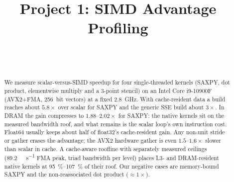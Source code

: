 \documentclass[11pt]{article}
\title{Project 1: SIMD Advantage Profiling}
\author{\acsauthor\\[2pt]\small\acscourse\\\small\href{mailto:\acsemail}{\acsemail}}
\date{\acsdue}
\begin{document}
\maketitle

\begin{abstract}
  We measure scalar-versus-SIMD speedup for four single-threaded kernels (SAXPY, dot product,
  elementwise multiply and a 3-point stencil) on an Intel Core i9-10900F (AVX2+FMA,
  \qty{256}{bit} vectors) at a fixed \qty{2.8}{\giga\hertz}. With cache-resident data a
   build reaches about $5.8\times$ over scalar for SAXPY and the generic SSE
  build about $3\times$. In DRAM the gain compresses to $1.88\text{--}2.02\times$ for SAXPY: the
  native kernels sit on the measured bandwidth roof, and what remains is the scalar loop's own
  instruction cost. Float64 usually keeps about half of float32's cache-resident gain. Any non-unit
  stride or gather erases the advantage; the AVX2 hardware gather is even $1.5\text{--}1.6\times$
  slower than scalar in cache. A cache-aware roofline with separately
  measured ceilings (\qty{89.2}{\giga\flop\per\second} FMA peak, triad bandwidth per level) places L3-
  and DRAM-resident native kernels at \SIrange{95}{107}{\percent} of their roof. Our negative cases
  are memory-bound SAXPY and the non-reassociated dot product ($\approx1\times$).
\end{abstract}

\ifacsdraft{\setcounter{tocdepth}{1}\tableofcontents}\fi
















\printbibliography

\appendix

\end{document}
